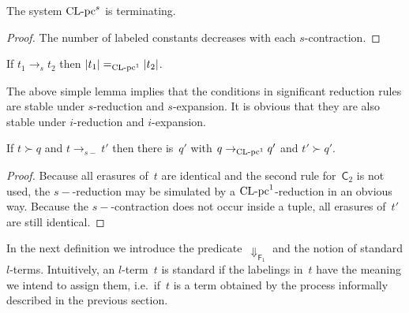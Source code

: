 \documentclass[a4paper,UKenglish]{lipics-v2016}
\newcommand{\Cs}{\mathsf{C}}
\newcommand{\Fs}{\mathsf{F}}
\newcommand{\Da}{\ensuremath{\Downarrow}}
\newcommand{\erase}[1]{\ensuremath{|#1|}}
\newcommand{\CLC}{{\mbox{${\text{\rm CL-pc}^1}$}}}
\newcommand{\sCLC}{{\ensuremath{\text{\rm CL-pc}^1}}}
\newcommand{\CLCs}{{\mbox{${\text{\rm CL-pc}^s}$}}}
\newcommand{\equiverased}{\succ}
\begin{document}
\begin{lemma}\label{lem_sn}
  The system $\CLCs$ is terminating.
\end{lemma}

\begin{proof}
  The number of labeled constants decreases with each
  $s$-contraction.
\end{proof}

\begin{lemma}
  If $t_1 \to_s t_2$ then $\erase{t_1} =_\sCLC \erase{t_2}$.
\end{lemma}

The above simple lemma implies that the conditions in significant
reduction rules are stable under $s$-reduction and $s$-expansion. It
is obvious that they are also stable under $i$-reduction and
$i$-expansion.

\begin{lemma}\label{lem_s_minus_erase}
  If $t \equiverased q$ and $t \to_{s{-}} t'$ then there is~$q'$ with
  $q \to_{\sCLC} q'$ and $t' \equiverased q'$.
\end{lemma}

\begin{proof}
  Because all erasures of~$t$ are identical and the second rule
  for~$\Cs_2$ is not used, the $s{-}$-reduction may be simulated by a
  $\CLC$-reduction in an obvious way. Because the $s{-}$-contraction
  does not occur inside a tuple, all erasures of~$t'$ are still
  identical.
\end{proof}

In the next definition we introduce the predicate~$\Da_{\Fs_1}$ and
the notion of standard $l$-terms. Intuitively, an $l$-term~$t$ is
standard if the labelings in~$t$ have the meaning we intend to assign
them, i.e.~if~$t$ is a term obtained by the process informally
described in the previous section.
\end{document}
